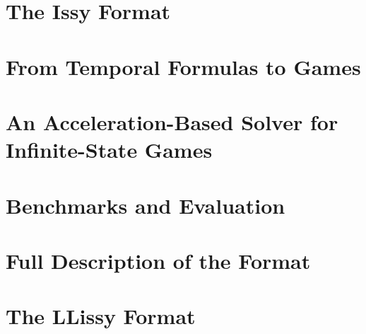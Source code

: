 \documentclass[runningheads]{llncs}
\begin{document}
\section{The Issy Format}\label{sec:format-issy}


\section{From Temporal Formulas to Games}\label{sec:to-game}


\section{An Acceleration-Based Solver for Infinite-State Games}\label{sec:solver}


\section{Benchmarks and Evaluation}\label{sec:experiments}






\newpage

\appendix

\section{Full Description of the \issy Format}\label{sec:format-issy-full}


\newpage

\section{The LLissy Format}\label{sec:format-llissy}

\end{document}

